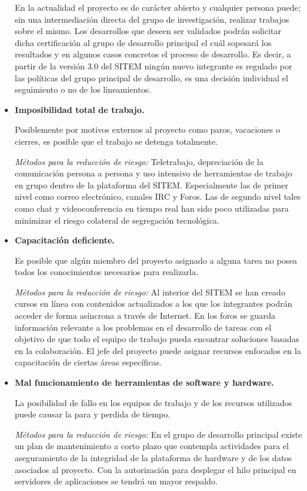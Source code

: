 \begin{itemize}
En la actualidad el proyecto es de carácter abierto y cualquier persona puede; sin una intermediación directa del grupo de investigación, realizar trabajos sobre el mismo. Los desarrollos que deseen ser validados podrán solicitar dicha certificación al grupo de desarrollo principal el cuál sopesará los resultados y en algunos casos concretos el proceso de desarrollo. Es decir, a partir de la versión 3.0 del SITEM ningún nuevo integrante es regulado por las políticas del grupo principal de desarrollo, es una decisión individual el seguimiento o no de los lineamientos.

\item \textbf{Imposibilidad total de trabajo.} 

Posiblemente por motivos externos al proyecto como paros, vacaciones o cierres, es posible que el trabajo se detenga totalmente.

\textit{Métodos para la reducción de riesgo:} Teletrabajo, depreciación de la comunicación persona a persona y uso intensivo de herramientas de trabajo en grupo dentro de la plataforma del SITEM. Especialmente las de primer nivel como correo electrónico, canales IRC y Foros. Las de segundo nivel tales como chat y videoconferencia en tiempo real han sido poco utilizadas para minimizar el riesgo colateral de segregación tecnológica. 

\item \textbf{Capacitación deficiente.} 

Es posible que algún miembro del proyecto asignado a alguna tarea no posea todos los conocimientos necesarios para realizarla.

\textit{Métodos para la reducción de riesgo:} Al interior del SITEM se han creado cursos en línea con contenidos actualizados a los que los integrantes podrán acceder de forma asíncrona a través de Internet. En los foros se guarda información relevante a los problemas en el desarrollo de tareas con el objetivo de que todo el equipo de trabajo pueda encontrar soluciones basadas en la colaboración. El jefe del proyecto puede asignar recursos enfocados en la capacitación de ciertas áreas específicas.

\item \textbf{Mal funcionamiento de herramientas de software y hardware.} 

La posibilidad de fallo en los equipos de trabajo y de los recursos utilizados puede causar la para y perdida de tiempo.

\textit{Métodos para la reducción de riesgo:} En el grupo de desarrollo principal existe un plan de mantenimiento a corto plazo que contempla actividades para el aseguramiento de la integridad de la plataforma de hardware y de los datos asociados al proyecto. Con la autorización para desplegar el hilo principal en servidores de aplicaciones se tendrá un mayor respaldo.


\end{itemize}
